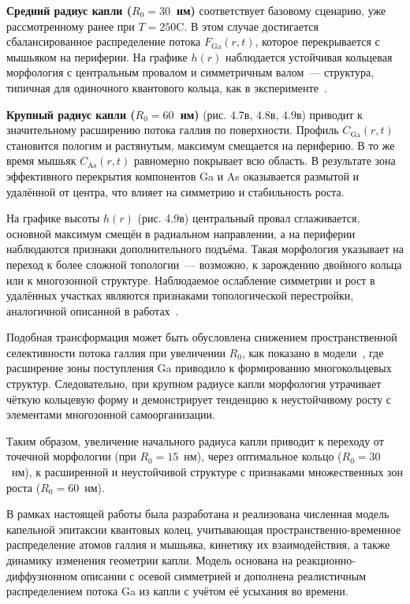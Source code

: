 \documentclass[14pt,oneside]{extarticle}
\begin{document}
\textbf{Средний радиус капли ($R_0 = 30$~нм)} соответствует базовому сценарию, уже рассмотренному ранее при $T = 250$\textdegree C. В этом случае достигается сбалансированное распределение потока $F_\mathrm{Ga}(r, t)$, которое перекрывается с мышьяком на периферии. На графике $h(r)$ наблюдается устойчивая кольцевая морфология с центральным провалом и симметричным валом~— структура, типичная для одиночного квантового кольца, как в эксперименте~\cite{mano2005nano}.

\textbf{Крупный радиус капли ($R_0 = 60$~нм)} (рис. 4.7в, 4.8в, 4.9в) приводит к значительному расширению потока галлия по поверхности. Профиль $C_\mathrm{Ga}(r, t)$ становится пологим и растянутым, максимум смещается на периферию. В то же время мышьяк $C_\mathrm{As}(r, t)$ равномерно покрывает всю область. В результате зона эффективного перекрытия компонентов Ga и As оказывается размытой и удалённой от центра, что влияет на симметрию и стабильность роста.

На графике высоты $h(r)$ (рис. 4.9в) центральный провал сглаживается, основной максимум смещён в радиальном направлении, а на периферии наблюдаются признаки дополнительного подъёма. Такая морфология указывает на переход к более сложной топологии~— возможно, к зарождению двойного кольца или к многозонной структуре. Наблюдаемое ослабление симметрии и рост в удалённых участках являются признаками топологической перестройки, аналогичной описанной в работах~\cite{mano2005nano, fan2023evaporation}.

Подобная трансформация может быть обусловлена снижением пространственной селективности потока галлия при увеличении $R_0$, как показано в модели~\cite{zhou2013}, где расширение зоны поступления Ga приводило к формированию многокольцевых структур. Следовательно, при крупном радиусе капли морфология утрачивает чёткую кольцевую форму и демонстрирует тенденцию к неустойчивому росту с элементами многозонной самоорганизации.

Таким образом, увеличение начального радиуса капли приводит к переходу от точечной морфологии (при $R_0 = 15$~нм), через оптимальное кольцо ($R_0 = 30$~нм), к расширенной и неустойчивой структуре с признаками множественных зон роста ($R_0 = 60$~нм).

\pagebreak
{}

В рамках настоящей работы была разработана и реализована численная модель капельной эпитаксии квантовых колец, учитывающая пространственно-временное распределение атомов галлия и мышьяка, кинетику их взаимодействия, а также динамику изменения геометрии капли. Модель основана на реакционно-диффузионном описании с осевой симметрией и дополнена реалистичным распределением потока Ga из капли с учётом её усыхания во времени.
\end{document}
